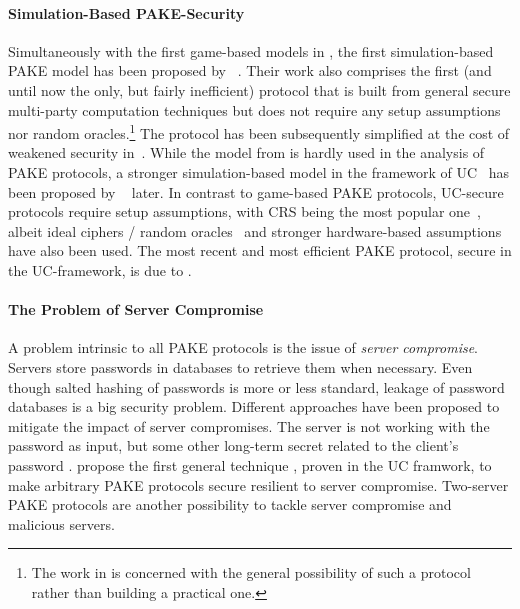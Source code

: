 \paragraph{Simulation-Based \ac{PAKE}-Security}
Simultaneously with the first game-based models in \cite{Bellare2000,Boyko2000}, the first simulation-based \ac{PAKE} model has been proposed by \citeauthor{Goldreich01}~\cite{Goldreich01}.
Their work also comprises the first (and until now the only, but fairly inefficient) protocol that is built from general secure multi-party computation techniques but does not require any setup assumptions nor random oracles.\footnote{The work in \cite{Goldreich01} is concerned with the general possibility of such a protocol rather than building a practical one.}
The protocol has been subsequently simplified at the cost of weakened security in~\cite{NguyenV04}.
While the model from \cite{Goldreich01} is hardly used in the analysis of \ac{PAKE} protocols, a stronger simulation-based model in the framework of \acl{UC}~\cite{Canetti2001a} has been proposed by \citeauthor{Canetti2005}~\cite{Canetti2005} later.
In contrast to game-based \ac{PAKE} protocols, \ac{UC}-secure protocols require setup assumptions, with \ac{CRS} being the most popular one~\cite{Katz2011}, albeit ideal ciphers / random oracles~\cite{Abdalla2008} and stronger hardware-based assumptions~\cite{cryptoeprint:2012:537} have also been used.
The most recent and most efficient \ac{PAKE} protocol, secure in the \ac{UC}-framework, is due to \citeauthor{Benhamouda2013} \cite{Benhamouda2013}.

\paragraph{The Problem of Server Compromise}
A problem intrinsic to all \ac{PAKE} protocols is the issue of \emph{server compromise}.
Servers store passwords in databases to retrieve them when necessary.
Even though salted hashing of passwords is more or less standard, leakage of password databases is a big security problem.
Different approaches have been proposed to mitigate the impact of server compromises.
The server is not working with the password as input, but some other long-term secret related to the client's password \cite{Wu1998,Boyen2009a}.
\citeauthor{Gentry2006} propose the first general technique \cite{Gentry2006}, proven in the \ac{UC} framwork, to make arbitrary \ac{PAKE} protocols secure resilient to server compromise.
Two-server \ac{PAKE} protocols are another possibility to tackle server compromise and malicious servers.

